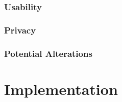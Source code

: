 \documentclass[12pt,dvips]{report}
\begin{document}
\subsection{Usability}
\subsection{Privacy}

\subsection{Potential Alterations}  %

\chapter{Implementation}
\end{document}
